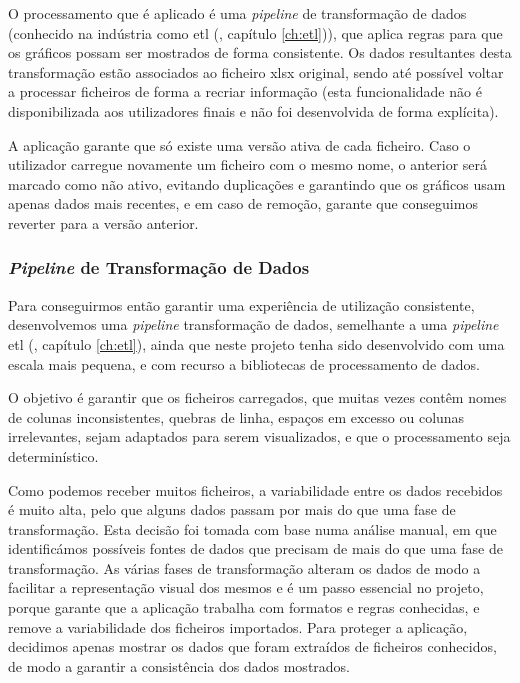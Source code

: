 O processamento que é aplicado é uma \textit{pipeline} de transformação de dados (conhecido na indústria como \gls{etl} (\cf, capítulo \ref{ch:etl})), que aplica regras para que os gráficos possam ser mostrados de forma consistente. Os dados resultantes desta transformação estão associados ao ficheiro \gls{xlsx} original, sendo até possível voltar a processar ficheiros de forma a recriar informação (esta funcionalidade não é disponibilizada aos utilizadores finais e não foi desenvolvida de forma explícita).

A aplicação garante que só existe uma versão ativa de cada ficheiro. Caso o utilizador carregue novamente um ficheiro com o mesmo nome, o anterior será marcado como não ativo, evitando duplicações e garantindo que os gráficos usam apenas dados mais recentes, e em caso de remoção, garante que conseguimos reverter para a versão anterior.

\subsubsection{\textit{Pipeline} de Transformação de Dados}

Para conseguirmos então garantir uma experiência de utilização consistente, desenvolvemos uma \textit{pipeline} transformação de dados, semelhante a uma \textit{pipeline} \gls{etl} (\cf, capítulo \ref{ch:etl}), ainda que neste projeto tenha sido desenvolvido com uma escala mais pequena, e com recurso a bibliotecas de processamento de dados. 

O objetivo é garantir que os ficheiros carregados, que muitas vezes contêm nomes de colunas inconsistentes, quebras de linha, espaços em excesso ou colunas irrelevantes, sejam adaptados para serem visualizados, e que o processamento seja determinístico.

Como podemos receber muitos ficheiros, a variabilidade entre os dados recebidos é muito alta, pelo que alguns dados passam por mais do que uma fase de transformação. Esta decisão foi tomada com base numa análise manual, em que identificámos possíveis fontes de dados que precisam de mais do que uma fase de transformação. As várias fases de transformação alteram os dados de modo a facilitar a representação visual dos mesmos e é um passo essencial no projeto, porque garante que a aplicação trabalha com formatos e regras conhecidas, e remove a variabilidade dos ficheiros importados. Para proteger a aplicação, decidimos apenas mostrar os dados que foram extraídos de ficheiros conhecidos, de modo a garantir a consistência dos dados mostrados.

